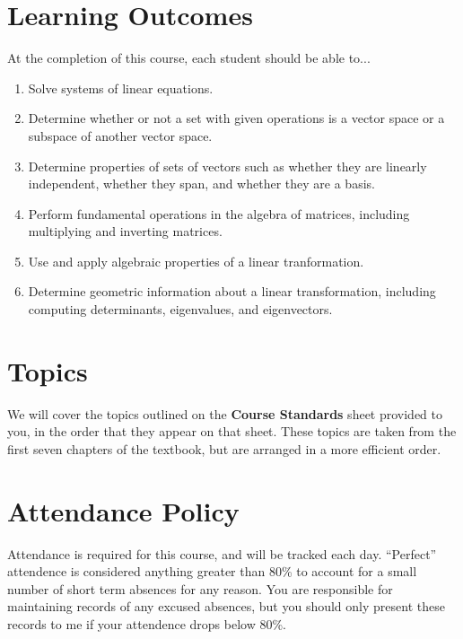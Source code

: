 \section*{\fontsize{12}{15}\selectfont Learning Outcomes}
At the completion of this course, each student should be able to...
\begin{enumerate}[1)]
\item Solve systems of linear equations.
\item Determine whether or not a set with given operations is a vector space or a subspace of another vector space.
\item Determine properties of sets of vectors such as whether they are linearly independent, whether they span, and whether they are a basis.
\item Perform fundamental operations in the algebra of matrices, including multiplying and inverting matrices.
\item Use and apply algebraic properties of a linear tranformation.
\item Determine geometric information about a linear transformation, including computing determinants, eigenvalues, and eigenvectors.
\end{enumerate}

\section*{\fontsize{12}{15}\selectfont Topics}
We will cover the topics outlined on the \textbf{Course Standards}
sheet provided to you, in the order that they appear on that sheet.
These topics are taken from the first seven chapters of the textbook,
but are arranged in a more efficient order.


\section*{\fontsize{12}{15}\selectfont Attendance Policy}
Attendance is required for this course, and will be tracked each day.
``Perfect'' attendence is considered anything greater than 80\%
to account for a small number of short term absences for any reason.
You are responsible for maintaining records of any excused absences,
but you should only present these records to me if your attendence drops
below 80\%.

